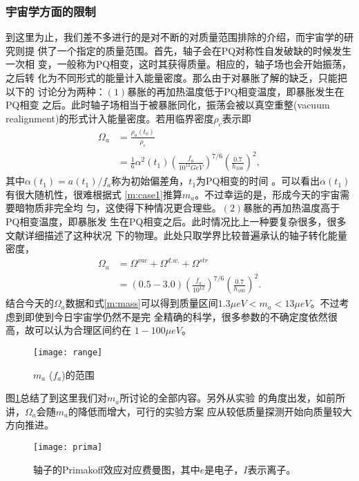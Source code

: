\documentclass[twocolumn,12pt,a4paper]{article}
\begin{document}
\subsubsection{宇宙学方面的限制}
\label{cconstrs}
到这里为止，我们差不多进行的是对不断的对质量范围排除的介绍，而宇宙学的研究则提
供了一个指定的质量范围。首先，轴子会在PQ对称性自发破缺的时候发生一次相
变，一般称为PQ相变，这时其获得质量。相应的，轴子场也会开始振荡，之后转
化为不同形式的能量计入能量密度。那么由于对暴胀了解的缺乏，只能把以下的
讨论分为两种：$(1)$暴胀的再加热温度低于PQ相变温度，即暴胀发生在PQ相变
之后。此时轴子场相当于被暴胀同化，振荡会被以真空重整(vacuum
realignment)的形式计入能量密度。若用临界密度$\rho_c$表示即
\begin{equation}
  \label{m:case1}
  \begin{split}
    \Omega_a &= \frac{\rho_a(t_0)}{\rho_c} \\
    &=
    \frac{1}{6}\alpha^2(t_1)(\frac{f_a}{10^{12}GeV})^{7/6}(\frac{0.7}{h_{100}})^2,
  \end{split}
\end{equation}
其中$\alpha(t_1) = a(t_1)/f_a$称为初始偏差角，$t_1$为PQ相变的时间
\cite{asztalos01}。可以看出$\alpha(t_1)$有很大随机性，很难根据式
\ref{m:case1}推算$m_a$。不过幸运的是，形成今天的宇宙需要暗物质非完全均
匀，这使得下种情况更合理些。$(2)$暴胀的再加热温度高于PQ相变温度，即暴胀发
生在PQ相变之后。此时情况比上一种要复杂很多，很多文献详细描述了这种状况
下的物理。此处只取学界比较普遍承认的轴子转化能量密度，
\begin{equation}
  \label{m:case2}
  \begin{split}
    \Omega_a &= \Omega^{vac}+\Omega^{d.w.}+\Omega^{str}\\
&= (0.5-3.0)(\frac{f_a}{10^{12}})^{7/6}(\frac{0.7}{h_{100}})^2.
  \end{split}
\end{equation}
结合今天的$\Omega_a$数据和式\ref{m:mass}可以得到质量区间$1.3\mu eV <
m_a < 13\mu eV$\cite{asztalos01}。不过考虑到即使到今日宇宙学仍然不是完
全精确的科学，很多参数的不确定度依然很高，故可以认为合理区间约在
$1-100\mu eV$。\par
\begin{figure}
  \centering
  \texttt{[image: range]}
  \caption{$m_a$ ($f_a$)的范围}
  \label{fig:constr}
\end{figure}
图\ref{fig:constr}\cite{asztalos01}总结了到这里我们对$m_a$所讨论的全部内容。另外从实验
的角度出发，如前所讲，$\Omega_a$会随$m_a$的降低而增大，可行的实验方案
应从较低质量探测开始向质量较大方向推进。
\begin{figure}[h!]
  \centering
  \texttt{[image: prima]}
  \caption{轴子的Primakoff效应对应费曼图，其中$e$是电子，$I$表示离子。}
  \label{f:prima}
\end{figure}
\end{document}
